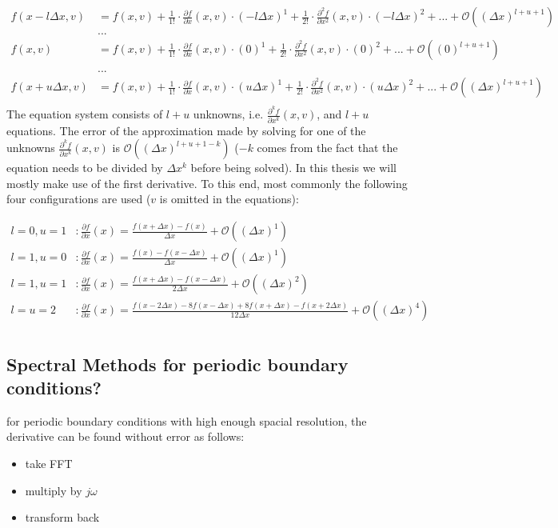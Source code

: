 \begin{align*}
f(x - l \Delta x,v) &= f(x,v) + \frac{1}{1!}\cdot\frac{\partial f}{\partial x}(x,v)\cdot (-l\Delta x)^1 + \frac{1}{2!}\cdot\frac{\partial^2 f}{\partial x^2}(x,v)\cdot (-l\Delta x)^2 + ... + \mathcal{O}((\Delta x) ^{l+u+1})\\
&...\\
f(x,v) &= f(x,v) + \frac{1}{1!}\cdot\frac{\partial f}{\partial x}(x,v)\cdot (0)^1 + \frac{1}{2!}\cdot\frac{\partial^2 f}{\partial x^2}(x,v)\cdot (0)^2 + ... + \mathcal{O}((0) ^{l+u+1})\\
\\
&...\\
f(x + u \Delta x,v) &= f(x,v) + \frac{1}{1!}\cdot\frac{\partial f}{\partial x}(x,v)\cdot (u\Delta x)^1 + \frac{1}{2!}\cdot\frac{\partial^2 f}{\partial x^2}(x,v)\cdot (u\Delta x)^2 + ... + \mathcal{O}((\Delta x) ^{l+u+1})\\
\end{align*}
The equation system consists of $l+u$ unknowns, i.e. $\frac{\partial^k f}{\partial x^k}(x,v)$, and $l+u$ equations.
The error of the approximation made by solving for one of the unknowns $\frac{\partial^k f}{\partial x^k}(x,v)$ is $\mathcal{O}((\Delta x) ^{l+u+1-k})$ ($-k$ comes from the fact that the equation needs to be divided by $\Delta x ^k$ before being solved).
In this thesis we will mostly make use of the first derivative.
To this end, most commonly the following four configurations are used ($v$ is omitted in the equations):

\begin{align*}
l=0,u=1&: \frac{\partial f}{\partial x}(x) = \frac{f(x+\Delta x) - f(x)}{\Delta x} + \mathcal{O}((\Delta x)^{1})\\
l=1,u=0&: \frac{\partial f}{\partial x}(x) = \frac{f(x) - f(x-\Delta x)}{\Delta x} + \mathcal{O}((\Delta x)^{1})\\
l=1,u=1&: \frac{\partial f}{\partial x}(x) = \frac{f(x + \Delta x) - f(x-\Delta x)}{2\Delta x} + \mathcal{O}((\Delta x)^{2})\\
l=u=2&: \frac{\partial f}{\partial x}(x) = \frac{f(x-2\Delta x) -8 f(x-\Delta x) + 8 f(x+\Delta x) - f(x+2\Delta x)}{12\Delta x} + \mathcal{O}((\Delta x)^{4})\\
\end{align*}

\subsection{Spectral Methods for periodic boundary conditions?}
for periodic boundary conditions with high enough spacial resolution, the derivative can be found without error as follows:
\begin{itemize}
\item take FFT
\item multiply by $j\omega$
\item transform back
\end{itemize}


